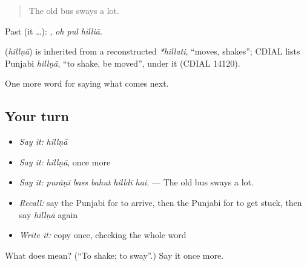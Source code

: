 \begin{quote}
The old bus sways a lot.
\end{quote}

Past (it …):   , \emph{oh pul hilliā}.

\begin{cousinweb}
\textbf{} (\emph{hillṇā}) is inherited from a reconstructed \emph{*hillati}, \textquotedblleft{}moves, shakes\textquotedblright{}; CDIAL lists Punjabi \emph{hillṇā}, \textquotedblleft{}to shake, be moved\textquotedblright{}, under it (CDIAL 14120).
\end{cousinweb}

\begin{grammarlens}[title={What you've built}]
One more word for saying what comes next.
\end{grammarlens}

\subsection*{Your turn}
\begin{itemize}
\raggedright
  \item \emph{Say it:} \emph{hillṇā}
  \item \emph{Say it:} \emph{hillṇā}, once more
  \item \emph{Say it:} \emph{purāṇī bass bahut hilldī hai.} — The old bus sways a lot.
  \item \emph{Recall:} say the Punjabi for to arrive, then the Punjabi for to get stuck, then say \emph{hillṇā} again
  \item \emph{Write it:} copy \textbf{} once, checking the whole word
\end{itemize}

\begin{tcolorbox}[breakable,colback=teal!4,colframe=teal!35!black,title={Before you move on}]
What does  mean? (\textquotedblleft{}To shake; to sway\textquotedblright{}.) Say it once more.
\end{tcolorbox}
